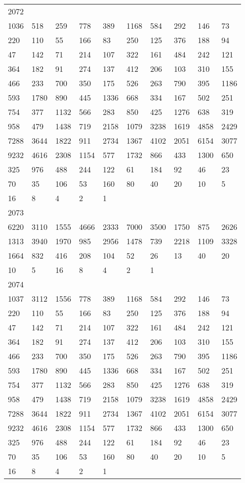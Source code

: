 \begin{longtable}{*{10}{l}}
2072&&&&&&&&&\\
1036& 518& 259& 778& 389& 1168& 584& 292& 146& 73\\
220& 110& 55& 166& 83& 250& 125& 376& 188& 94\\
47& 142& 71& 214& 107& 322& 161& 484& 242& 121\\
364& 182& 91& 274& 137& 412& 206& 103& 310& 155\\
466& 233& 700& 350& 175& 526& 263& 790& 395& 1186\\
593& 1780& 890& 445& 1336& 668& 334& 167& 502& 251\\
754& 377& 1132& 566& 283& 850& 425& 1276& 638& 319\\
958& 479& 1438& 719& 2158& 1079& 3238& 1619& 4858& 2429\\
7288& 3644& 1822& 911& 2734& 1367& 4102& 2051& 6154& 3077\\
9232& 4616& 2308& 1154& 577& 1732& 866& 433& 1300& 650\\
325& 976& 488& 244& 122& 61& 184& 92& 46& 23\\
70& 35& 106& 53& 160& 80& 40& 20& 10& 5\\
16& 8& 4& 2& 1& \\

2073&&&&&&&&&\\
6220& 3110& 1555& 4666& 2333& 7000& 3500& 1750& 875& 2626\\
1313& 3940& 1970& 985& 2956& 1478& 739& 2218& 1109& 3328\\
1664& 832& 416& 208& 104& 52& 26& 13& 40& 20\\
10& 5& 16& 8& 4& 2& 1& \\

2074&&&&&&&&&\\
1037& 3112& 1556& 778& 389& 1168& 584& 292& 146& 73\\
220& 110& 55& 166& 83& 250& 125& 376& 188& 94\\
47& 142& 71& 214& 107& 322& 161& 484& 242& 121\\
364& 182& 91& 274& 137& 412& 206& 103& 310& 155\\
466& 233& 700& 350& 175& 526& 263& 790& 395& 1186\\
593& 1780& 890& 445& 1336& 668& 334& 167& 502& 251\\
754& 377& 1132& 566& 283& 850& 425& 1276& 638& 319\\
958& 479& 1438& 719& 2158& 1079& 3238& 1619& 4858& 2429\\
7288& 3644& 1822& 911& 2734& 1367& 4102& 2051& 6154& 3077\\
9232& 4616& 2308& 1154& 577& 1732& 866& 433& 1300& 650\\
325& 976& 488& 244& 122& 61& 184& 92& 46& 23\\
70& 35& 106& 53& 160& 80& 40& 20& 10& 5\\
16& 8& 4& 2& 1& \\


\end{longtable}
